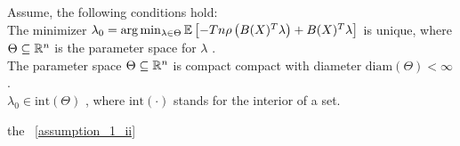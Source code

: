 \begin{asu}
  \label{assumption_1}
  Assume, the following conditions hold:
  \\
  \subasu 
  \label{assumption_1_i} 
  The minimizer 
  $
  \lambda_0 
  =
  \arg \min_{\lambda \in \Theta}
  \mathbb{E}
  \left[ 
    -T n 
    \rho 
    \left( 
    B(X)^T \lambda
    \right)
    +
    B(X)^T \lambda
  \right]
  $
  is unique,
  where 
  $\Theta \subseteq \mathbb{R}^n$ is the parameter space for $\lambda$
  .
  \\
  \subasu 
  \label{assumption_1_ii} 
  The parameter space 
  $\Theta \subseteq \mathbb{R}^n$
  is compact compact with diameter
  $\text{diam}(\Theta) < \infty$
  .
  \\
  \subasu 
  \label{assumption_1_iii}
  $\lambda_0 \in \text{int}(\Theta)$
  , where
  $\text{int}(\cdot)$
  stands for the interior of a set.
\end{asu}


the ~\ref{assumption_1_ii}
